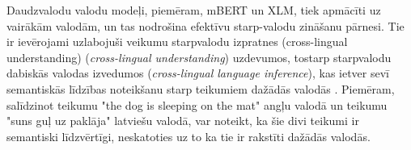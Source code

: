 




Daudzvalodu valodu modeļi, piemēram, mBERT un XLM, tiek apmācīti uz vairākām valodām, un tas nodrošina efektīvu starp-valodu zināšanu pārnesi. Tie ir ievērojami uzlabojuši veikumu starpvalodu izpratnes (cross-lingual understanding) (\textit{cross-lingual understanding}) uzdevumos, tostarp starpvalodu dabiskās valodas izvedumos (\textit{cross-lingual language inference}), kas ietver sevī semantiskās līdzības noteikšanu starp teikumiem dažādās valodās \cite{conneau2020}. Piemēram, salīdzinot teikumu "the dog is sleeping on the mat" angļu valodā un teikumu "suns guļ uz paklāja" latviešu valodā, var noteikt, ka šie divi teikumi ir semantiski līdzvērtīgi, neskatoties uz to ka tie ir rakstīti dažādās valodās.